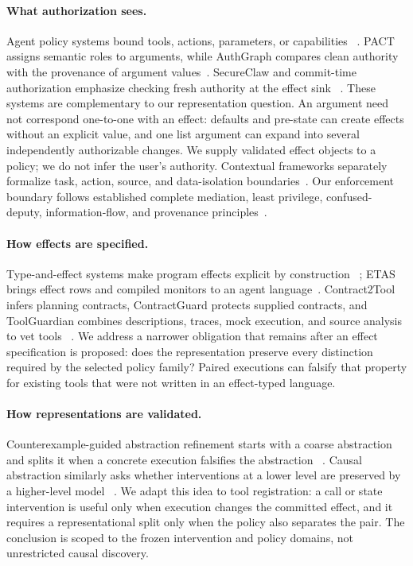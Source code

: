 \documentclass[letterpaper,twocolumn,10pt]{article}
\theoremstyle{definition}
\begin{document}
\paragraph{What authorization sees.}
Agent policy systems bound tools, actions, parameters, or capabilities
~\cite{progent,miniscope,clawguard,scopegate,agentguard}.  PACT assigns semantic
roles to arguments, while AuthGraph compares clean authority with the
provenance of argument values~\cite{pact,authgraph}.  SecureClaw and commit-time
authorization emphasize checking fresh authority at the effect sink
~\cite{secureclaw,committimeauth}.  These systems are complementary to our
representation question.  An argument need not correspond one-to-one with an
effect: defaults and pre-state can create effects without an explicit value,
and one list argument can expand into several independently authorizable
changes.  We supply validated effect objects to a policy; we do not infer the
user's authority.  Contextual frameworks separately formalize task, action,
source, and data-isolation boundaries~\cite{siu2026formalizing}.  Our
enforcement boundary follows established complete
mediation, least privilege, confused-deputy, information-flow, and provenance
principles~\cite{saltzer1975protection,dennis1966programming,hardy1988confused,denning1976lattice,buneman2001why,cheney2009provenance}.

\paragraph{How effects are specified.}
Type-and-effect systems make program effects explicit by construction
~\cite{lucassen1988effects}; ETAS brings effect rows and compiled monitors to an
agent language~\cite{etas2026}.  Contract2Tool infers planning contracts,
ContractGuard protects supplied contracts, and ToolGuardian combines
descriptions, traces, mock execution, and source analysis to vet tools
~\cite{contract2tool,contractguard,toolguardian2026}.  We address a narrower
obligation that remains after an effect specification is proposed: does the
representation preserve every distinction required by the selected policy
family?  Paired executions can falsify that property for existing tools that
were not written in an effect-typed language.

\paragraph{How representations are validated.}
Counterexample-guided abstraction refinement starts with a coarse abstraction
and splits it when a concrete execution falsifies the abstraction
~\cite{clarke2000cegar}.  Causal abstraction similarly asks whether
interventions at a lower level are preserved by a higher-level model
~\cite{pearl2009causality,beckers2019abstracting,geiger2022inducing}.  We adapt
this idea to tool registration: a call or state intervention is useful only
when execution changes the committed effect, and it requires a representational
split only when the policy also separates the pair.  The conclusion is scoped
to the frozen intervention and policy domains, not unrestricted causal
discovery.
\end{document}
